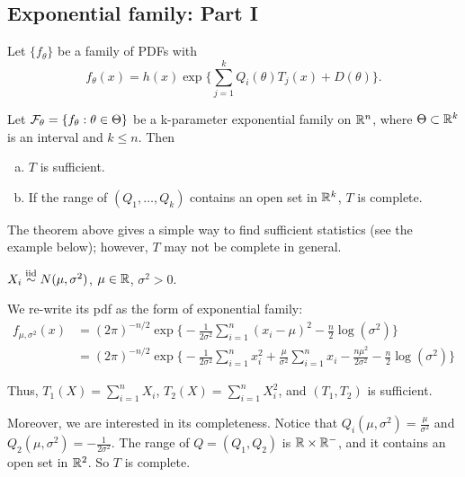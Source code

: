 \subsection{Exponential family: Part I}
\begin{mydef}
	Let $\{f_\theta\}$ be a family of PDFs with 
	$$f_\theta(x) = h(x)\exp\Big \{  \sum_{j=1}^{k} Q_i(\theta)T_j(x) + D(\theta)  \Big \}.$$
\end{mydef}
\begin{comment}
\begin{remark}
	content...
\end{remark}

\begin{exap}
	content...
\end{exap}

\end{comment}
{\color{blue}
\begin{thm}
	Let $\mathcal{F}_\theta = \{ f_\theta: \theta \in \Theta \}$ be a k-parameter exponential family on $\mathbb{R}^n$, where $\Theta \subset \mathbb{R}^k$ is an interval and $k\leq n$. Then
	\begin{enumerate}[a)]
		\item $T$ is sufficient.
		\item If the range of $(Q_1, \dots, Q_k)$ contains an open set in $\mathbb{R}^k$, $T$ is complete.
	\end{enumerate} 
\end{thm}
}
The theorem above gives a simple way to find sufficient statistics (see the example below); however, $T$ may not be complete in general. 
\begin{exap} 
	$X_i \stackrel{\text{iid}}{\sim} N(\mu, \sigma^2)$, $\mu \in \mathbb{R}$, $\sigma^2 > 0$.
	
	We re-write its pdf as the form of exponential family:
	\begin{align*}
		f_{\mu,\sigma^2} (x) &= (2\pi)^{-n/2} \exp \Big \{  - \frac{1}{2\sigma^2} \sum_{i=1}^n (x_i - \mu)^2 - \frac{n}{2} \log( \sigma^2) \Big \} \\
		&= (2\pi)^{-n/2} \exp \Big \{  - \frac{1}{2\sigma^2} \sum_{i=1}^n x_i^2 + \frac{\mu}{\sigma^2} \sum_{i=1}^n x_i - \frac{n\mu^2}{2\sigma^2} - \frac{n}{2} \log( \sigma^2) \Big \}
	\end{align*}
	
	Thus, $T_1(X) = \sum_{i=1}^n X_i$, $T_2(X) = \sum_{i=1}^n X_i^2$, and $(T_1, T_2)$ is sufficient.
	
	Moreover, we are interested in its completeness. Notice that $Q_i(\mu,\sigma^2) = \frac{\mu}{\sigma^2}$ and $Q_2(\mu,\sigma^2) = -\frac{1}{2\sigma^2}$. The range of $Q = (Q_1, Q_2)$ is $\mathbb{R} \times \mathbb{R}^-$, and it contains an open set in $\mathbb{R}^2$. So $T$ is complete.  
\end{exap}

